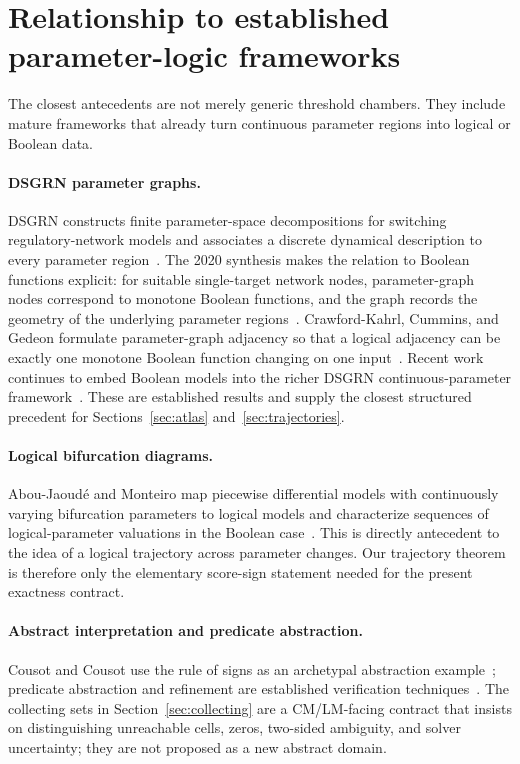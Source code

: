 \documentclass[11pt]{article}
\theoremstyle{definition}
\theoremstyle{remark}
\begin{document}
\section{Relationship to established parameter-logic frameworks}\label{sec:prior}

The closest antecedents are not merely generic threshold chambers. They include mature frameworks that already turn continuous parameter regions into logical or Boolean data.

\paragraph{DSGRN parameter graphs.}
DSGRN constructs finite parameter-space decompositions for switching regulatory-network models and associates a discrete dynamical description to every parameter region~\cite{CumminsEtAl2018}. The 2020 synthesis makes the relation to Boolean functions explicit: for suitable single-target network nodes, parameter-graph nodes correspond to monotone Boolean functions, and the graph records the geometry of the underlying parameter regions~\cite{Gedeon2020}. Crawford-Kahrl, Cummins, and Gedeon formulate parameter-graph adjacency so that a logical adjacency can be exactly one monotone Boolean function changing on one input~\cite{CrawfordKahrlEtAl2022}. Recent work continues to embed Boolean models into the richer DSGRN continuous-parameter framework~\cite{CumminsEtAl2026}. These are established results and supply the closest structured precedent for Sections~\ref{sec:atlas} and~\ref{sec:trajectories}.

\paragraph{Logical bifurcation diagrams.}
Abou-Jaoud\'e and Monteiro map piecewise differential models with continuously varying bifurcation parameters to logical models and characterize sequences of logical-parameter valuations in the Boolean case~\cite{AbouJaoudeMonteiro2019}. This is directly antecedent to the idea of a logical trajectory across parameter changes. Our trajectory theorem is therefore only the elementary score-sign statement needed for the present exactness contract.

\paragraph{Abstract interpretation and predicate abstraction.}
Cousot and Cousot use the rule of signs as an archetypal abstraction example~\cite{CousotCousot1977}; predicate abstraction and refinement are established verification techniques~\cite{ChakiEtAl2003}. The collecting sets in Section~\ref{sec:collecting} are a CM/LM-facing contract that insists on distinguishing unreachable cells, zeros, two-sided ambiguity, and solver uncertainty; they are not proposed as a new abstract domain.
\end{document}
